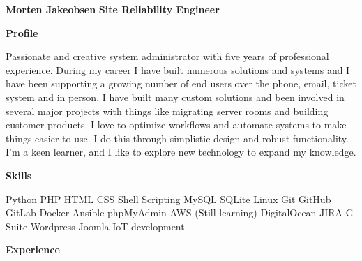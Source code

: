 \documentclass[11pt]{article}
\begin{document}
\raggedright
\textcolor{mygreen}{{\fontsize{25}{30}\textbf{Morten Jakeobsen}}}\newline
\textcolor{mygreen}{{\fontsize{13}{16}\textbf{Site Reliability Engineer}}}\newline

\textcolor{mygreen}{{\fontsize{13}{16}\textbf{{Profile}}}}\newline

Passionate and creative system administrator with five years of professional experience. During my career I have
built numerous solutions and systems and I have been supporting a growing number of end users over the phone,
email, ticket system and in person. I have built many custom solutions and been involved in several major
projects with things like migrating server rooms and building customer products. I love to optimize workflows
and automate systems to make things easier to use. I do this through simplistic design and robust functionality.
I’m a keen learner, and I like to explore new technology to expand my knowledge.\newline

\textcolor{mygreen}{{\fontsize{13}{0}\textbf{{Skills}}}}
\begin{multicols}{3}
Python\newline
PHP\newline
HTML\newline
CSS\newline
Shell Scripting\newline
MySQL\newline
SQLite\newline
Linux\newline
Git\newline
GitHub\newline
GitLab\newline
Docker\newline
Ansible\newline
phpMyAdmin\newline
AWS (Still learning)\newline
DigitalOcean\newline
JIRA\newline
G-Suite\newline
Wordpress\newline
Joomla\newline
IoT development
\end{multicols}

\textcolor{mygreen}{{\fontsize{13}{16}\textbf{{Experience}}}}\newline
\end{document}
